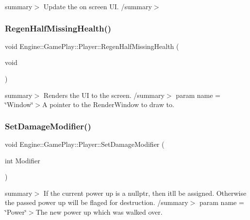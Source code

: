 summary$>$ Update the on screen UI. /summary$>$ \mbox{\label{class_engine_1_1_game_play_1_1_player_aad2c7f9e75ef259e202be0d00924ec1d}} 
\subsubsection{\texorpdfstring{Regen\+Half\+Missing\+Health()}{RegenHalfMissingHealth()}}
{\footnotesize\ttfamily void Engine\+::\+Game\+Play\+::\+Player\+::\+Regen\+Half\+Missing\+Health (\begin{DoxyParamCaption}\item[{void}]{ }\end{DoxyParamCaption})}

summary$>$ Renders the UI to the screen. /summary$>$ param name = \char`\"{}\+Window\char`\"{}$>$A pointer to the Render\+Window to draw to.\mbox{\label{class_engine_1_1_game_play_1_1_player_a04dccb49dde0606ba440b07944abdc65}} 
\subsubsection{\texorpdfstring{Set\+Damage\+Modifier()}{SetDamageModifier()}}
{\footnotesize\ttfamily void Engine\+::\+Game\+Play\+::\+Player\+::\+Set\+Damage\+Modifier (\begin{DoxyParamCaption}\item[{int}]{Modifier }\end{DoxyParamCaption})}

summary$>$ If the current power up is a nullptr, then it\textquotesingle{}ll be assigned. Otherwise the passed power up will be flaged for destruction. /summary$>$ param name = \char`\"{}\+Power\char`\"{}$>$The new power up which was walked over.\mbox{\label{class_engine_1_1_game_play_1_1_player_adedc5552f70e5495ca1391b6f6143bec}} 
